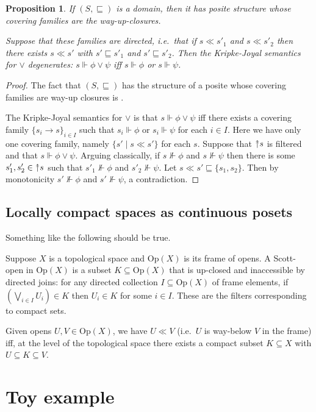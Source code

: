 \documentclass[11pt, oneside, article]{memoir}
\theoremstyle{plain}
\newtheorem{proposition}[theorem]{Proposition}
\theoremstyle{definition}
\theoremstyle{remark}
\renewcommand{\ss}{\subseteq}
\newcommand{\Set}[1]{\mathrm{#1}}
\newcommand{\Op}{\Set{Op}}
\newcommand{\sqss}{\sqsubseteq}
\newcommand{\upclose}{{\rotatebox[origin=c]{90}{$\twoheadrightarrow$}}}
\begin{document}
\begin{proposition}
If $(S,\sqss)$ is a domain, then it has posite structure whose covering families are the way-up-closures.

Suppose that these families are directed, i.e.\ that if $s\ll s'_1$ and $s\ll s'_2$ then there exists $s\ll s'$ with $s'\sqss s'_1$ and $s'\sqss s'_2$. Then the Kripke-Joyal semantics for $\vee$ degenerates: $s\Vdash\phi\vee\psi$ iff $s\Vdash\phi$ or $s\Vdash\psi$.
\end{proposition}
\begin{proof}
The fact that $(S,\sqss)$ has the structure of a posite whose covering families are way-up closures is \cite[Remark 2.21]{Schultz.Spivak:2017a}.

The Kripke-Joyal semantics for $\vee$ is that $s\Vdash\phi\vee\psi$ iff there exists a covering family $\{s_i\to s\}_{i\in I}$ such that $s_i\Vdash\phi$ or $s_i\Vdash\psi$ for each $i\in I$. Here we have only one covering family, namely $\{s'\mid s\ll s'\}$ for each $s$. Suppose that $\upclose s$ is filtered and that $s\Vdash\phi\vee\psi$. Arguing classically, if $s\not\Vdash\phi$ and $s\not\Vdash\psi$ then there is some $s'_1,s'_2\in\upclose s$ such that $s'_1\not\Vdash\phi$ and $s'_2\not\Vdash\psi$. Let $s\ll s'\sqss \{s_1,s_2\}$. Then by monotonicity $s'\not\Vdash\phi$ and $s'\not\Vdash\psi$, a contradiction.
\end{proof}

\section{Locally compact spaces as continuous posets}
Something like the following should be true.

Suppose $X$ is a topological space and $\Op(X)$ is its frame of opens. A Scott-open in $\Op(X)$ is a subset $K\ss\Op(X)$ that is up-closed and inaccessible by directed joins: for any directed collection $I\ss\Op(X)$ of frame elements, if $(\bigvee_{i\in I} U_i)\in K$ then $U_i\in K$ for some $i\in I$. These are the filters corresponding to compact sets.

Given opens $U,V\in\Op(X)$, we have $U\ll V$ (i.e.\ $U$ is way-below $V$ in the frame) iff, at the level of the topological space there exists a compact subset $K\ss X$ with $U\ss K\ss V$.


\chapter{Toy example}
\end{document}
